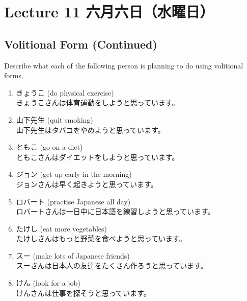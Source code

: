 \documentclass[notoc,notitlepage]{tufte-book}
\begin{document}
\chapter{Lecture 11 六月六日（水曜日）}%
\label{chp:lecture_11_liu_yue_liu_ri_shui_yao_ri_}

\section{Volitional Form (Continued)}%
\label{sec:volitional_form_continued}

\begin{ex}
  Describe what each of the following person is planning to do using volitional forms.

  \begin{enumerate}
    \item きょうこ (do physical exercise) \\
      きょうこさんは体育運動をしようと思っています。
    \item 山下先生 (quit smoking) \\
      山下先生はタバコをやめようと思っています。
    \item ともこ (go on a diet) \\
      ともこさんはダイエットをしようと思っています。
    \item ジョン (get up early in the morning) \\
      ジョンさんは早く起きようと思っています。
    \item ロバート (practise Japanese all day) \\
      ロバートさんは一日中に日本語を練習しようと思っています。
    \item たけし (eat more vegetables) \\
      たけしさんはもっと野菜を食べようと思っています。
    \item スー (make lots of Japanese friends) \\
      スーさんは日本人の友達をたくさん作ろうと思っています。
    \item けん (look for a job) \\
      けんさんは仕事を探そうと思っています。
  \end{enumerate}
\end{ex}


\end{document}
